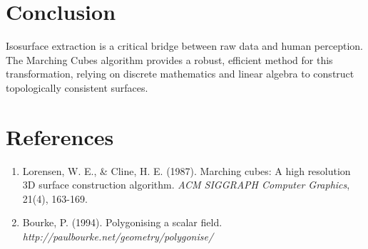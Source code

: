 \documentclass{article}
\begin{document}
\section{Conclusion}
Isosurface extraction is a critical bridge between raw data and human perception. The Marching Cubes algorithm provides a robust, efficient method for this transformation, relying on discrete mathematics and linear algebra to construct topologically consistent surfaces.

\section{References}
\begin{enumerate}
    \item Lorensen, W. E., \& Cline, H. E. (1987). Marching cubes: A high resolution 3D surface construction algorithm. \textit{ACM SIGGRAPH Computer Graphics}, 21(4), 163-169.
    \item Bourke, P. (1994). Polygonising a scalar field. \textit{http://paulbourke.net/geometry/polygonise/}
\end{enumerate}
\end{document}
